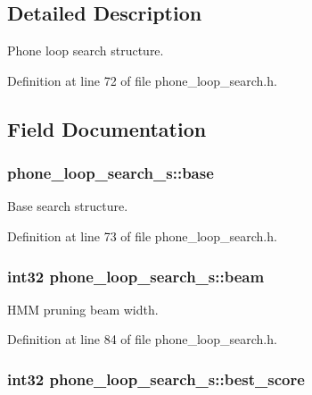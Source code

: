 \subsection{Detailed Description}
Phone loop search structure. 

Definition at line 72 of file phone\-\_\-loop\-\_\-search.\-h.



\subsection{Field Documentation}
\subsubsection[{base}]{ phone\-\_\-loop\-\_\-search\-\_\-s\-::base}\label{structphone__loop__search__s_aea1cf9ffda814f681b57f32c1f8cc3b1}


Base search structure. 



Definition at line 73 of file phone\-\_\-loop\-\_\-search.\-h.

\subsubsection[{beam}]{\setlength{\rightskip}{0pt plus 5cm}int32 phone\-\_\-loop\-\_\-search\-\_\-s\-::beam}\label{structphone__loop__search__s_a1aa6103c72ce8159bd21bfa4f97feff3}


H\-M\-M pruning beam width. 



Definition at line 84 of file phone\-\_\-loop\-\_\-search.\-h.

\subsubsection[{best\-\_\-score}]{\setlength{\rightskip}{0pt plus 5cm}int32 phone\-\_\-loop\-\_\-search\-\_\-s\-::best\-\_\-score}\label{structphone__loop__search__s_af6bf0231db2587a3f7ffa3f838b84db5}


